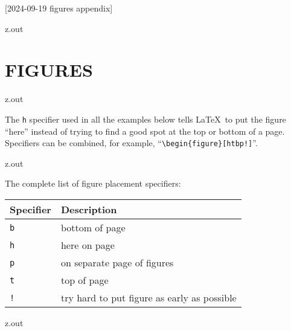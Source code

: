 [2024-09-19 figures appendix]

\begin{VerbatimOut}{z.out}
\chapter{FIGURES}
\end{VerbatimOut}

\MyIO


\begin{VerbatimOut}{z.out}

The
\verb+h+
specifier used in all the examples below
tells \LaTeX\ to put the figure
``here''
instead of trying
to find a good spot
at the top or bottom of a page.
Specifiers can be combined,
for example,
``\verb+\begin{figure}[htbp!]+''.
\end{VerbatimOut}

\MyIO


\begin{VerbatimOut}{z.out}

The complete list of figure placement specifiers:
\vspace*{6pt}
\begin{center}
  \begin{tabular}{@{}ll@{}}
    \toprule
    \bf Specifier& \bf Description\\
    \midrule
    \noalign{\vspace*{2pt}}
    \tt b& bottom of page\\
    \tt h& here on page\\
    \tt p& on separate page of figures\\
    \tt t& top of page\\
    \tt !& try hard to put figure as early as possible\\
    \bottomrule
  \end{tabular}
\end{center}
\index{\verb+\begin{tabular}+}
\end{VerbatimOut}

\MyIO



\begin{VerbatimOut}{z.out}

\end{VerbatimOut}

